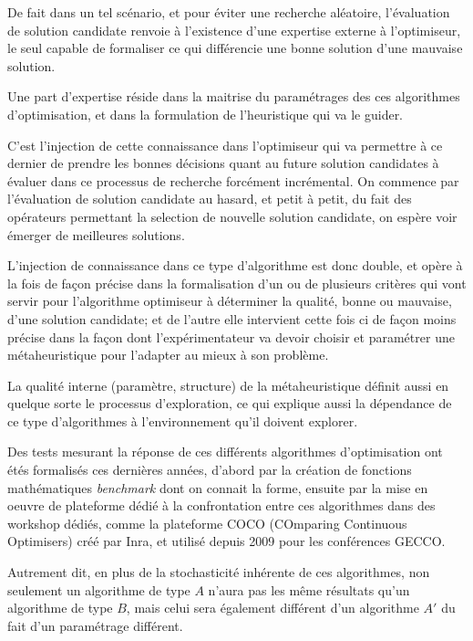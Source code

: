 De fait dans un tel scénario, et pour éviter une recherche aléatoire, l'évaluation de solution candidate renvoie à l'existence d'une expertise externe à l'optimiseur, le seul capable de formaliser ce qui différencie une bonne solution d'une mauvaise solution. 





Une part d'expertise réside dans la maitrise du paramétrages des ces algorithmes d'optimisation, et dans la formulation de l'heuristique qui va le guider.

C'est l'injection de cette connaissance dans l'optimiseur qui va permettre à ce dernier de prendre les bonnes décisions quant au future solution candidates à évaluer dans ce processus de recherche forcément incrémental. On commence par l'évaluation de solution candidate au hasard, et petit à petit, du fait des opérateurs permettant la selection de nouvelle solution candidate, on espère voir émerger de meilleures solutions.

L'injection de connaissance dans ce type d'algorithme est donc double, et opère à la fois de façon précise dans la formalisation d'un ou de plusieurs critères qui vont servir pour l'algorithme optimiseur à déterminer la qualité, bonne ou mauvaise, d'une solution candidate; et de l'autre elle intervient cette fois ci de façon moins précise dans la façon dont l'expérimentateur va devoir choisir et paramétrer une métaheuristique pour l'adapter au mieux à son problème.

La qualité interne (paramètre, structure) de la métaheuristique définit aussi en quelque sorte le processus d'exploration, ce qui explique aussi la dépendance de ce type d'algorithmes à l'environnement qu'il doivent explorer.

Des tests mesurant la réponse de ces différents algorithmes d'optimisation ont étés formalisés ces dernières années, d'abord par la création de fonctions mathématiques \textit{benchmark} dont on connait la forme, ensuite par la mise en oeuvre de plateforme dédié à la confrontation entre ces algorithmes dans des workshop dédiés, comme la plateforme COCO (COmparing Continuous Optimisers) créé par Inra, et utilisé depuis 2009 pour les conférences GECCO.

Autrement dit, en plus de la stochasticité inhérente de ces algorithmes, non seulement un algorithme de type $A$ n'aura pas les même résultats qu'un algorithme de type $B$, mais celui sera également différent d'un algorithme $A'$ du fait d'un paramétrage différent.

